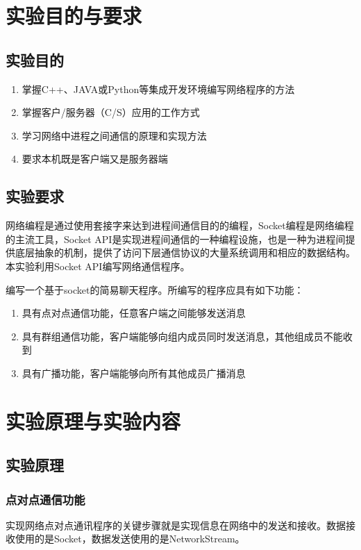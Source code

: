 \documentclass[UTF8,12pt]{article}
\begin{document}
\begin{center}
    \tableofcontents
\end{center}
\newpage

\section{实验目的与要求}
\subsection{实验目的}
\begin{enumerate}
    \item 掌握C++、JAVA或Python等集成开发环境编写网络程序的方法
    \item 掌握客户/服务器（C/S）应用的工作方式
    \item 学习网络中进程之间通信的原理和实现方法
    \item 要求本机既是客户端又是服务器端
\end{enumerate}
\subsection{实验要求}
网络编程是通过使用套接字来达到进程间通信目的的编程，Socket编程是网络编程的主流工具，Socket API是实现进程间通信的一种编程设施，也是一种为进程间提供底层抽象的机制，提供了访问下层通信协议的大量系统调用和相应的数据结构。本实验利用Socket API编写网络通信程序。

编写一个基于socket的简易聊天程序。所编写的程序应具有如下功能：
\begin{enumerate}
    \item 具有点对点通信功能，任意客户端之间能够发送消息
    \item 具有群组通信功能，客户端能够向组内成员同时发送消息，其他组成员不能收到
    \item 具有广播功能，客户端能够向所有其他成员广播消息
\end{enumerate}
\section{实验原理与实验内容}
\subsection{实验原理}
\subsubsection{点对点通信功能}
实现网络点对点通讯程序的关键步骤就是实现信息在网络中的发送和接收。数据接收使用的是Socket，数据发送使用的是NetworkStream。
\end{document}
